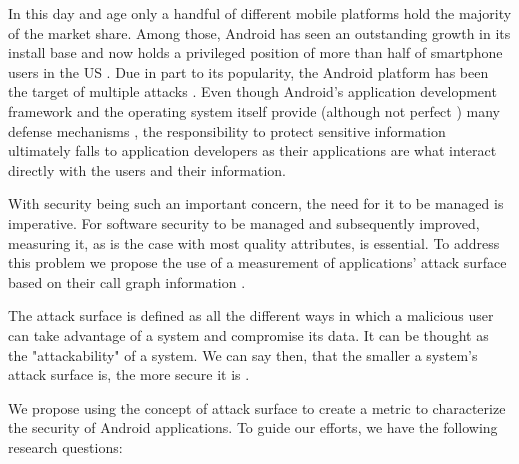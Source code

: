 \documentclass{sig-alternate}
\begin{document}
In this day and age only a handful of different mobile platforms hold the majority of the market share. Among those, Android has seen an outstanding growth in its install base and now holds a privileged position of more than half of smartphone users in the US \cite{_android_news}. Due in part to its popularity, the Android platform has been the target of multiple attacks \cite{vidas_all_2011}. Even though Android's application development framework and the operating system itself provide (although not perfect \cite{shabtai_google_2010}) many defense mechanisms \cite{burns2009mobile} \cite{enck2011study}, the responsibility to protect sensitive information ultimately falls to application developers as their applications are what interact directly with the users and their information.

With security being such an important concern, the need for it to be managed is imperative. For software security to be managed and subsequently improved, measuring it, as is the case with most quality attributes, is essential. To address this problem we propose the use of a measurement of applications' attack surface based on their call graph information \cite{Manadhata2011AnAttackSurfaceMetric}.

The attack surface is defined as all the different ways in which a malicious user can take advantage of a system and compromise its data. It can be thought as the "attackability" of a system. We can say then, that the smaller a system's attack surface is, the more secure it is \cite{Manadhata2011AnAttackSurfaceMetric}.

We propose using the concept of attack surface to create a metric to characterize the security of Android applications. To guide our efforts, we have the following research questions:
\end{document}
